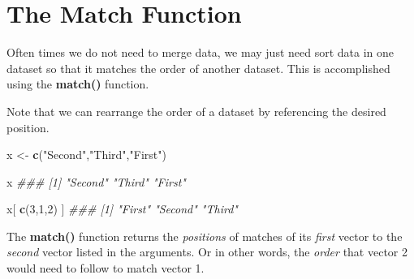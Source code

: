 \documentclass[]{book}
\newenvironment{Shaded}{\begin{snugshade}}{\end{snugshade}}
\newcommand{\CommentTok}[1]{\textcolor[rgb]{0.56,0.35,0.01}{\textit{#1}}}
\newcommand{\DecValTok}[1]{\textcolor[rgb]{0.00,0.00,0.81}{#1}}
\newcommand{\KeywordTok}[1]{\textcolor[rgb]{0.13,0.29,0.53}{\textbf{#1}}}
\newcommand{\NormalTok}[1]{#1}
\newcommand{\OperatorTok}[1]{\textcolor[rgb]{0.81,0.36,0.00}{\textbf{#1}}}
\newcommand{\StringTok}[1]{\textcolor[rgb]{0.31,0.60,0.02}{#1}}
\theoremstyle{definition}
\theoremstyle{definition}
\theoremstyle{definition}
\theoremstyle{remark}
\begin{document}
\begin{Shaded}
\end{Shaded}

\hypertarget{the-match-function}{%
\section{The Match Function}\label{the-match-function}}

Often times we do not need to merge data, we may just need sort data in
one dataset so that it matches the order of another dataset. This is
accomplished using the \textbf{match()} function.

Note that we can rearrange the order of a dataset by referencing the
desired position.

\begin{Shaded}
\begin{Highlighting}[]

\NormalTok{x <-}\StringTok{ }\KeywordTok{c}\NormalTok{(}\StringTok{"Second"}\NormalTok{,}\StringTok{"Third"}\NormalTok{,}\StringTok{"First"}\NormalTok{)}

\NormalTok{x}
\CommentTok{### [1] "Second" "Third"  "First"}

\NormalTok{x[ }\KeywordTok{c}\NormalTok{(}\DecValTok{3}\NormalTok{,}\DecValTok{1}\NormalTok{,}\DecValTok{2}\NormalTok{) ]}
\CommentTok{### [1] "First"  "Second" "Third"}
\end{Highlighting}
\end{Shaded}

The \textbf{match()} function returns the \emph{positions} of matches of
its \emph{first} vector to the \emph{second} vector listed in the
arguments. Or in other words, the \emph{order} that vector 2 would need
to follow to match vector 1.
\end{document}
